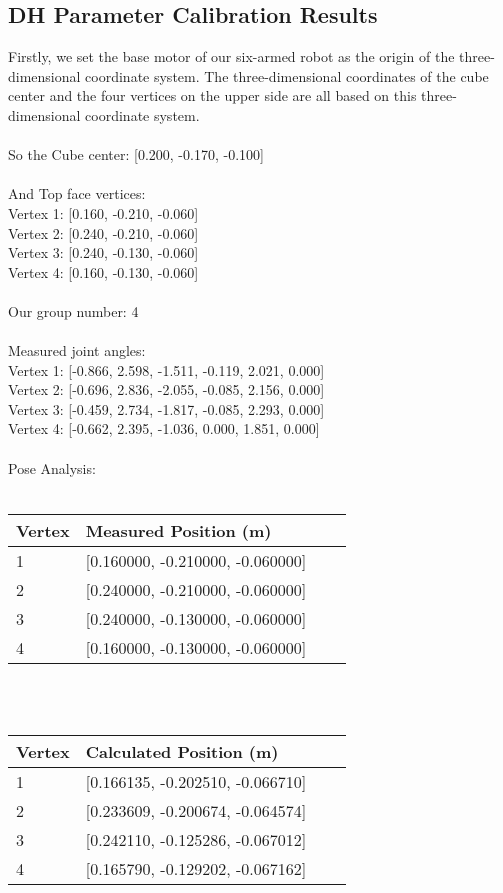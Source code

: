 \documentclass[conference]{IEEEtran}
\begin{document}
\subsection{DH Parameter Calibration Results}
\indent Firstly, we set the base motor of our six-armed robot as the origin of the three-dimensional coordinate system. The three-dimensional coordinates of the cube center and the four vertices on the upper side are all based on this three-dimensional coordinate system.\\\\
So the Cube center: [0.200, -0.170, -0.100]\\\\
And Top face vertices:\\
Vertex 1: [0.160, -0.210, -0.060]\\
Vertex 2: [0.240, -0.210, -0.060]\\
Vertex 3: [0.240, -0.130, -0.060]\\
Vertex 4: [0.160, -0.130, -0.060]\\\\
Our group number: 4\\\\
Measured joint angles:\\
Vertex 1: [-0.866, 2.598, -1.511, -0.119, 2.021, 0.000]\\
Vertex 2: [-0.696, 2.836, -2.055, -0.085, 2.156, 0.000]\\
Vertex 3: [-0.459, 2.734, -1.817, -0.085, 2.293, 0.000]\\
Vertex 4: [-0.662, 2.395, -1.036, 0.000, 1.851, 0.000]\\
\\
Pose Analysis:\\\\
\begin{tabular}{llll}
\toprule
Vertex & Measured Position (m) \\
\midrule
1 & [0.160000, -0.210000, -0.060000] \\
2 & [0.240000, -0.210000, -0.060000] \\
3 & [0.240000, -0.130000, -0.060000] \\
4 & [0.160000, -0.130000, -0.060000] \\
\bottomrule
\end{tabular}
\\\\

\begin{tabular}{llll}
\toprule
Vertex & Calculated Position (m) \\
\midrule
1 & [0.166135, -0.202510, -0.066710]\\
2 & [0.233609, -0.200674, -0.064574]\\
3 & [0.242110, -0.125286, -0.067012]\\
4 & [0.165790, -0.129202, -0.067162]\\
\end{tabular}
\\\\
\end{document}

